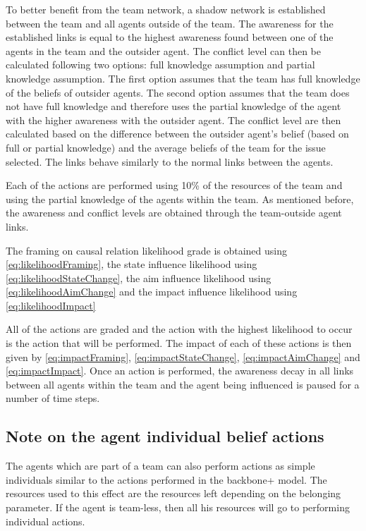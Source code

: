 \begin{itemize}
To better benefit from the team network, a shadow network is established between the team and all agents outside of the team. The awareness for the established links is equal to the highest awareness found between one of the agents in the team and the outsider agent. The conflict level can then be calculated following two options: full knowledge assumption and partial knowledge assumption. The first option assumes that the team has full knowledge of the beliefs of outsider agents. The second option assumes that the team does not have full knowledge and therefore uses the partial knowledge of the agent with the higher awareness with the outsider agent. The conflict level are then calculated based on the difference between the outsider agent’s belief (based on full or partial knowledge) and the average beliefs of the team for the issue selected. The links behave similarly to the normal links between the agents.

Each of the actions are performed using 10\% of the resources of the team and using the partial knowledge of the agents within the team. As mentioned before, the awareness and conflict levels are obtained through the team-outside agent links. 


The framing on causal relation likelihood grade is obtained using \autoref{eq:likelihoodFraming}, the state influence likelihood using \autoref{eq:likelihoodStateChange}, the aim influence likelihood using \autoref{eq:likelihoodAimChange} and the impact influence likelihood using \autoref{eq:likelihoodImpact}

All of the actions are graded and the action with the highest likelihood to occur is the action that will be performed. The impact of each of these actions is then given by \autoref{eq:impactFraming}, \autoref{eq:impactStateChange}, \autoref{eq:impactAimChange} and \autoref{eq:impactImpact}. Once an action is performed, the awareness decay in all links between all agents within the team and the agent being influenced is paused for a number of time steps.

\end{itemize}

\subsection{Note on the agent individual belief actions}

The agents which are part of a team can also perform actions as simple individuals similar to the actions performed in the backbone+ model. The resources used to this effect are the resources left depending on the belonging parameter. If the agent is team-less, then all his resources will go to performing individual actions.


